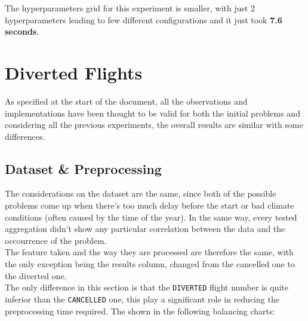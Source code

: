 \documentclass[
	letterpaper, %
	10pt, %
]{class}
\begin{document}
The hyperparameters grid for this experiment is smaller, with just 2 hyperparameters leading to few different configurations and it just took \textbf{7.6 seconds}.

\section{Diverted Flights}

As specified at the start of the document, all the observations and implementations have been thought to be valid for both the initial problems and considering all the previous experiments, the overall results are similar with some differences.\\

\subsection{Dataset \& Preprocessing}
The considerations on the dataset are the same, since both of the possible problems come up when there's too much delay before the start or bad climate conditions (often caused by the time of the year). In the same way, every tested aggregation didn't show any particular correlation between the data and the occourrence of the problem.\\
The feature taken and the way they are processed are therefore the same, with the only exception being the results column, changed from the cancelled one to the diverted one.\\

The only difference in this section is that the \texttt{DIVERTED} flight number is quite inferior than the \texttt{CANCELLED} one, this play a significant role in reducing the preprocessing time required.
The shown in the following balancing charts:\\
\end{document}

